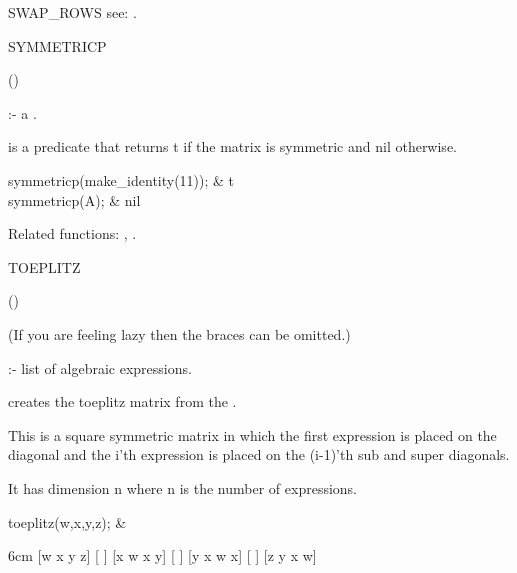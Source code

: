 \begin{Operator}[swaprows]{SWAP_ROWS}
see:  .
\end{Operator}


\begin{Operator}[symmetricp]{SYMMETRICP}

\begin{Syntax}
()
\end{Syntax}
 
 :- a .

 is a predicate that returns t if the matrix is symmetric 
and nil otherwise.


\begin{Examples}

symmetricp(make_identity(11)); &
t \\
symmetricp(A); &
nil\\

\end{Examples}

Related functions: , .

\end{Operator}


\begin{Operator}[toeplitz]{TOEPLITZ}

\begin{Syntax}
() 
\end{Syntax}
(If you are feeling lazy then the braces can be omitted.)

 :- list of algebraic expressions.

 creates the toeplitz matrix from the . 

This is a square symmetric matrix in which the first expression is 
placed on the diagonal and the i'th expression is placed on the (i-1)'th
sub and super diagonals.

It has dimension n where n is the number of expressions.


\begin{Examples}

toeplitz({w,x,y,z}); &
\begin{multilineoutput}{6cm}
[w  x  y  z]
[          ]
[x  w  x  y]
[          ]
[y  x  w  x]
[          ]
[z  y  x  w]
\end{multilineoutput}

\end{Examples}

\end{Operator}


